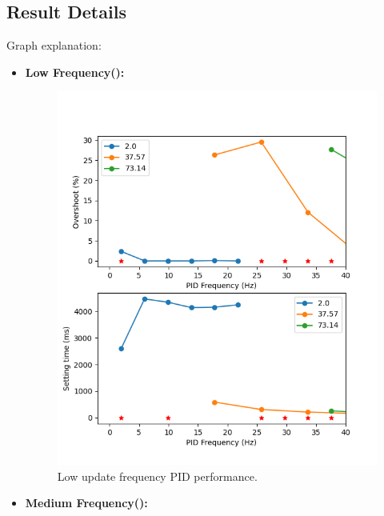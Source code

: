 \documentclass[conference]{IEEEtran}
\begin{document}
\subsection{Result Details}
Graph explanation: 
\begin{itemize}
    \item \textbf{Low Frequency():}
        \begin{figure}[htbp]
        \centerline{\includegraphics[width=\linewidth,height = 0.3\textheight]{Report/Pic/ResultLowFrequency.png}}
        \caption{Low update frequency PID performance.}
        \label{fig_FrequencyRange}
        \end{figure}
    \item \textbf{Medium Frequency():} 
        \begin{figure}[htbp]

\end{figure}
\end{itemize}
\end{document}
